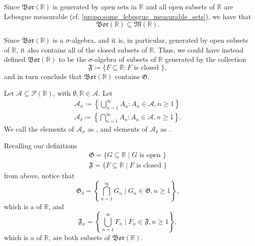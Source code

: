 \documentclass[notoc,notitlepage]{tufte-book}
\newcommand{\Bor}{\mathfrak{Bor}}
\begin{document}
\begin{note}
  Since $\Bor(\mathbb{R})$ is generated by open sets in $\mathbb{R}$ and all
  open subsets of $\mathbb{R}$ are Lebesgue measurable (cf.
  \cref{propo:some_lebesgue_measurable_sets}), we have that
  \begin{equation*}
    \Bor(\mathbb{R}) \subseteq \mathfrak{M}(\mathbb{R}).
  \end{equation*}
\end{note}

\begin{remark}
  Since $\Bor(\mathbb{R})$ is a $\sigma$-algebra, and it is, in particular,
  generated by open subsets of $\mathbb{R}$, it also contains all of the closed
  subsets of $\mathbb{R}$. Thus, we could have instead defined
  $\Bor(\mathbb{R})$ to be the $\sigma$-algebra of subsets of $\mathbb{R}$ 
  generated by the collection
  \begin{equation*}
    \mathfrak{F} \coloneqq \{ F \subseteq \mathbb{R} : F \text{ is closed } \},
  \end{equation*}
  and in turn conclude that $\Bor(\mathbb{R})$ contains $\mathfrak{G}$.
\end{remark}

\begin{remark}
  Let $\mathcal{A} \subseteq \mathcal{P}(\mathbb{R})$, with $\emptyset,
  \mathbb{R} \in \mathcal{A}$. Let
  \begin{gather*}
    \mathcal{A}_{\sigma} \coloneqq \left\{ \bigcup_{n=1}^{\infty} A_n : A_n \in
    \mathcal{A}, n \geq 1 \right\} \\
    \mathcal{A}_{\delta} \coloneqq \left\{ \bigcap_{n=1}^{\infty} A_n : A_n \in
    \mathcal{A}, n \geq 1 \right\}.
  \end{gather*}
  We call the elements of $\mathcal{A}_{\sigma}$ as , and elements of $\mathcal{A}_{\delta}$ as .

  Recalling our definitions
  \begin{gather*}
    \mathfrak{G} = \{ G \subseteq \mathbb{R} \mid G \text{ is open } \} \\
    \mathfrak{F} = \{ F \subseteq \mathbb{R} \mid F \text{ is closed } \}
  \end{gather*}
  from above, notice that
  \begin{equation*}
    \mathfrak{G}_{\delta} = \left\{ \bigcap_{n=1}^{\infty} G_n \mid G_n \in
    \mathfrak{G}, n \geq 1 \right\},
  \end{equation*}
  which is a  of $\mathbb{R}$, and
  \begin{equation*}
    \mathfrak{F}_{\sigma} = \left\{ \bigcup_{n=1}^{\infty} F_n \mid F_n \in
    \mathfrak{F}, n \geq 1 \right\},
  \end{equation*}
  which is a  of $\mathbb{R}$, are
  both subsets of $\Bor(\mathbb{R})$.
\end{remark}
\end{document}
